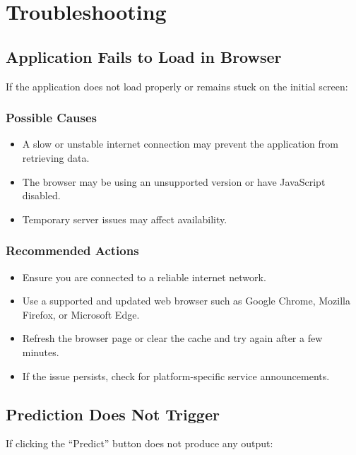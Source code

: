 %
%

\chapter{Troubleshooting}

\section{Application Fails to Load in Browser}
If the application does not load properly or remains stuck on the initial screen:

\subsection{Possible Causes}
\begin{itemize}
	\item A slow or unstable internet connection may prevent the application from retrieving data.
	\item The browser may be using an unsupported version or have JavaScript disabled.
	\item Temporary server issues may affect availability.
\end{itemize}

\subsection{Recommended Actions}
\begin{itemize}
	\item Ensure you are connected to a reliable internet network.
	\item Use a supported and updated web browser such as Google Chrome, Mozilla Firefox, or Microsoft Edge.
	\item Refresh the browser page or clear the cache and try again after a few minutes.
	\item If the issue persists, check for platform-specific service announcements.
\end{itemize}

\section{Prediction Does Not Trigger}
If clicking the ``Predict'' button does not produce any output:


